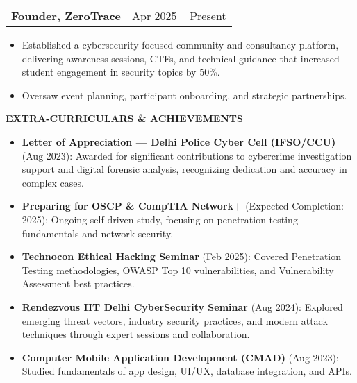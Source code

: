 \documentclass[a4paper]{article}
\begin{document}
\vspace{0.3em} 
\begin{tabularx}{\textwidth}{@{}X r@{}} 
\textbf{Founder, ZeroTrace} & Apr 2025 -- Present \\ 
\end{tabularx} 
\begin{itemize} 
\item Established a cybersecurity-focused community and consultancy platform, delivering awareness sessions, CTFs, and technical guidance that increased student engagement in security topics by 50\%. 
\item Oversaw event planning, participant onboarding, and strategic partnerships. 
\end{itemize} 
\begin{sectionbox}\textbf{EXTRA-CURRICULARS \& ACHIEVEMENTS}\end{sectionbox} 
\vspace{0em} 
\begin{itemize} 
\item \textbf{Letter of Appreciation — Delhi Police Cyber Cell (IFSO/CCU)} (Aug 2023): Awarded for significant contributions to cybercrime investigation support and digital forensic analysis, recognizing dedication and accuracy in complex cases. 
\item \textbf{Preparing for OSCP \& CompTIA Network+} (Expected Completion: 2025): Ongoing self-driven study, focusing on penetration testing fundamentals and network security. 
\item \textbf{Technocon Ethical Hacking Seminar} (Feb 2025): Covered Penetration Testing methodologies, OWASP Top 10 vulnerabilities, and Vulnerability Assessment best practices. 
\item \textbf{Rendezvous IIT Delhi CyberSecurity Seminar} (Aug 2024): Explored emerging threat vectors, industry security practices, and modern attack techniques through expert sessions and collaboration. 
\item \textbf{Computer Mobile Application Development (CMAD)} (Aug 2023): Studied fundamentals of app design, UI/UX, database integration, and APIs. 
\end{itemize} 
\end{document}
